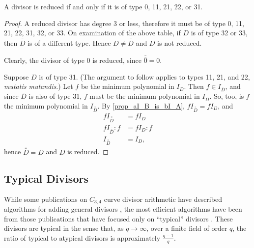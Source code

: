 \begin{theorem}
  A divisor is reduced if and only if it is of type 0, 11, 21, 22, or 31.
\end{theorem}
\begin{proof}
  A reduced divisor has degree 3 or less, therefore it must be of type 0, 11, 21, 22, 31, 32, or 33.
  On examination of the above table, if $D$ is of type 32 or 33, then $\bar{\bar D}$ is of a different type.
  Hence $D \neq \bar{\bar D}$ and $D$ is not reduced.
  
  Clearly, the divisor of type 0 is reduced, since $\bar{\bar 0} = 0$.
  
  Suppose $D$ is of type 31.
  (The argument to follow applies to types 11, 21, and 22, \emph{mutatis mutandis}.)
  Let $f$ be the minimum polynomial in $I_D$.
  Then $f \in I_{\bar D}$, and since $\bar D$ is also of type 31, $f$ must be the minimum polynomial in $I_{\bar D}$.
  So, too, is $f$ the minimum polynomial in $I_{\bar{\bar D}}$.
  By \ref{prop_aI_B_is_bI_A}, $f I_{\bar{\bar D}} = f I_D$, and
  \begin{align*}
    f I_{\bar{\bar D}} &= f I_D \\
    f I_{\bar{\bar D}} : f &= f I_D : f \\
    I_{\bar{\bar D}} &= I_D,
  \end{align*}
  hence $\bar{\bar D} = D$ and $D$ is reduced.
\end{proof}




\subsection{Typical Divisors}

While some publications on $C_{3,4}$ curve divisor arithmetic have described algorithms for adding general divisors
\cite{arita05-2, harasawa00},
the most efficient algorithms have been from those publications that have focused only on ``typical'' divisors
\cite{salem07, kmakdisi18, flon08}.
These divisors are typical in the sense that, as $q \to \infty$,
over a finite field of order $q$,
the ratio of typical to atypical divisors is approximately $\frac {q - 1} q$.

